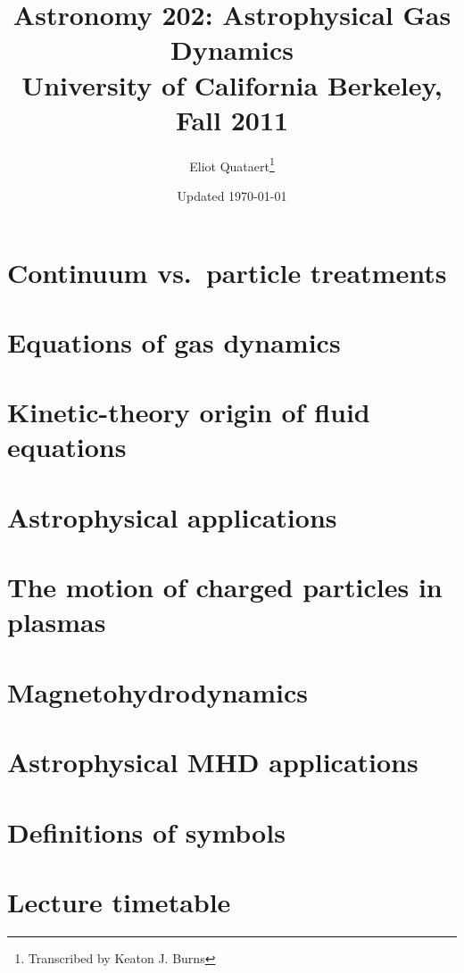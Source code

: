 \documentclass[letterpaper, 11pt]{report}
\begin{document}
\title{Astronomy 202: Astrophysical Gas Dynamics \\ \Large{University of California Berkeley, Fall 2011}}
\author{Eliot Quataert\thanks{Transcribed by Keaton J. Burns}}
\date{Updated \today}
\maketitle
\tableofcontents

\chapter{Continuum vs.~particle treatments}
%

\chapter{Equations of gas dynamics}


\chapter{Kinetic-theory origin of fluid equations}
%

\chapter{Astrophysical applications}
%

\chapter{The motion of charged particles in plasmas}
%

\chapter{Magnetohydrodynamics}
%

\chapter{Astrophysical MHD applications}
%

\appendix
\chapter{Definitions of symbols}


\chapter{Lecture timetable}

\end{document}
